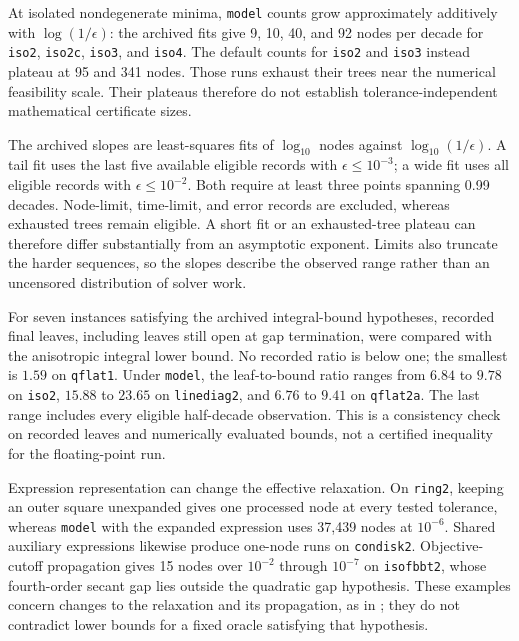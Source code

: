 At isolated nondegenerate minima, \texttt{model} counts grow
approximately additively with $\log(1/\epsilon)$: the archived fits give
9, 10, 40, and 92 nodes per decade for \texttt{iso2}, \texttt{iso2c},
\texttt{iso3}, and \texttt{iso4}. The default counts for
\texttt{iso2} and \texttt{iso3} instead plateau at 95 and 341 nodes.
Those runs exhaust their trees near the numerical feasibility scale.
Their plateaus therefore do not establish tolerance-independent
mathematical certificate sizes.

The archived slopes are least-squares fits of $\log_{10}$ nodes against
$\log_{10}(1/\epsilon)$. A tail fit uses the last five available eligible
records with $\epsilon\leq10^{-3}$; a wide fit uses all eligible records
with $\epsilon\leq10^{-2}$. Both require at least three points spanning
0.99 decades. Node-limit, time-limit, and error records are excluded,
whereas exhausted trees remain eligible. A short fit or an exhausted-tree
plateau can therefore differ substantially from an asymptotic exponent.
Limits also truncate the harder sequences, so the slopes describe the
observed range rather than an uncensored distribution of solver work.

For seven instances satisfying the archived integral-bound hypotheses,
recorded final leaves, including leaves still open at gap termination,
were compared with the anisotropic integral lower bound. No recorded ratio
is below one; the smallest is $1.59$ on \texttt{qflat1}. Under
\texttt{model}, the leaf-to-bound ratio ranges from $6.84$ to $9.78$
on \texttt{iso2}, $15.88$ to $23.65$ on \texttt{linediag2}, and
$6.76$ to $9.41$ on \texttt{qflat2a}. The last range includes every
eligible half-decade observation. This is a consistency check on recorded
leaves and numerically evaluated bounds, not a certified inequality for
the floating-point run.

Expression representation can change the effective relaxation. On
\texttt{ring2}, keeping an outer square unexpanded gives one processed
node at every tested tolerance, whereas \texttt{model} with the expanded
expression uses 37,439 nodes at $10^{-6}$. Shared auxiliary expressions
likewise produce one-node runs on \texttt{condisk2}. Objective-cutoff
propagation gives 15 nodes over $10^{-2}$ through $10^{-7}$ on
\texttt{isofbbt2}, whose fourth-order secant gap lies outside the quadratic
gap hypothesis. These examples concern changes to the relaxation and its
propagation, as in ; they do not contradict lower
bounds for a fixed oracle satisfying that hypothesis.

